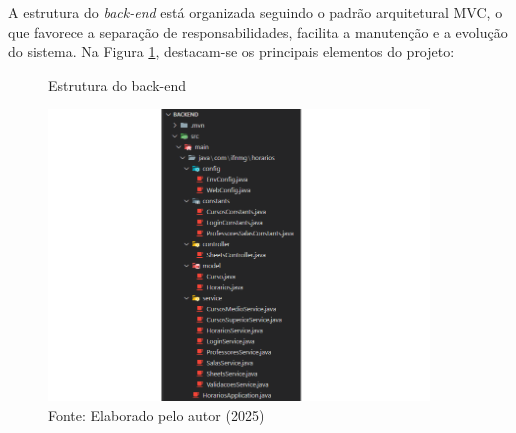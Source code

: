 A estrutura do \textit{back-end} está organizada seguindo o padrão arquitetural MVC, o que favorece a separação de responsabilidades, facilita a manutenção e a evolução do sistema. Na Figura \ref{fig_back_1}, destacam-se os principais elementos do projeto:

\begin{figure}[htb]
    \centering
    \caption{Estrutura do back-end}
    \includegraphics[width=0.9\textwidth]{Figuras/back-1.png}
    \caption*{Fonte: Elaborado pelo autor (2025)}
    \label{fig_back_1}
\end{figure}

